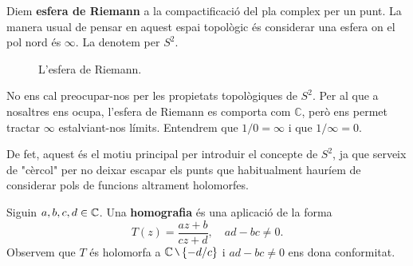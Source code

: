 \documentclass[dvipsnames, svgnames, leqno, a4paper, 12pt]{article}
\begin{document}
        Diem \textbf{esfera de Riemann} a la compactificació del pla complex per un punt. La manera usual de pensar en aquest espai topològic és considerar una esfera on el pol nord és \(\infty\). La denotem per \(S^2\).

        \begin{figure}[H]
            \centering


            \caption{L'esfera de Riemann.}
        \end{figure}
        No ens cal preocupar-nos per les propietats topològiques de \(S^2\). Per al que a nosaltres ens ocupa, l'esfera de Riemann es comporta com \(\mathbb{C}\), però ens permet tractar \(\infty\) estalviant-nos límits. Entendrem que \(1/0 = \infty\) i que \(1/\infty = 0\).

        De fet, aquest és el motiu principal per introduir el concepte de \(S^2\), ja que serveix de "cèrcol" per no deixar escapar els punts que habitualment hauríem de considerar pols de funcions altrament holomorfes.

        Siguin \(a,b,c,d\in \mathbb{C}\). Una \textbf{homografia} és una aplicació de la forma
        \begin{displaymath}
            T(z)=\frac{az+b}{cz+d},\quad ad-bc\neq0.
        \end{displaymath}
        Observem que $T$ és holomorfa a $\C\mysetminus\{-d/c\}$ i $ad-bc\neq0$ ens dona conformitat.
        
\end{document}

